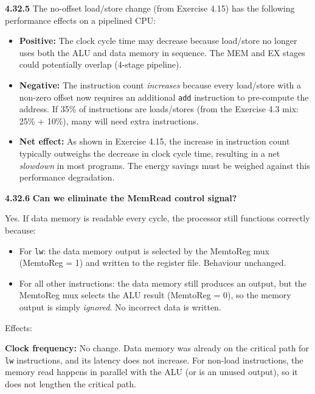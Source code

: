\medskip\noindent\textbf{4.32.5}
The no-offset load/store change (from Exercise 4.15) has the following
performance effects on a pipelined CPU:

\begin{itemize}
\item \textbf{Positive:} The clock cycle time may decrease because load/store
      no longer uses both the ALU and data memory in sequence.  The MEM and
      EX stages could potentially overlap (4-stage pipeline).

\item \textbf{Negative:} The instruction count \emph{increases} because every
      load/store with a non-zero offset now requires an additional \texttt{add}
      instruction to pre-compute the address.  If 35\% of instructions are
      loads/stores (from the Exercise 4.3 mix: 25\% + 10\%), many will need
      extra instructions.

\item \textbf{Net effect:}  As shown in Exercise 4.15, the increase in
      instruction count typically outweighs the decrease in clock cycle time,
      resulting in a net \emph{slowdown} in most programs.  The energy savings
      must be weighed against this performance degradation.
\end{itemize}

\medskip\noindent\textbf{4.32.6}
\textbf{Can we eliminate the MemRead control signal?}

Yes.  If data memory is readable every cycle, the processor still functions
correctly because:
\begin{itemize}
\item For \texttt{lw}: the data memory output is selected by the MemtoReg mux
      (MemtoReg = 1) and written to the register file.  Behaviour unchanged.
\item For all other instructions: the data memory still produces an output,
      but the MemtoReg mux selects the ALU result (MemtoReg = 0), so the
      memory output is simply \emph{ignored}.  No incorrect data is written.
\end{itemize}

\noindent Effects:

\textbf{Clock frequency:}  No change.  Data memory was already on the critical
path for \texttt{lw} instructions, and its latency does not increase.  For
non-load instructions, the memory read happens in parallel with the ALU (or
is an unused output), so it does not lengthen the critical path.

